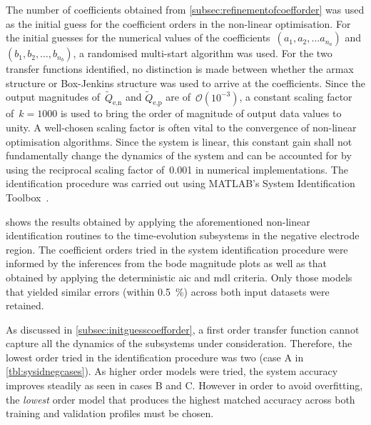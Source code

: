The  number of  coefficients obtained  from \cref{subsec:refinementofcoefforder}
was  used as  the initial  guess for  the coefficient  orders in  the non-linear
optimisation.  For  the  initial  guesses   for  the  numerical  values  of  the
coefficients~$(a_1, a_2,  \dots a_{n_a})$ and ${(b_1, b_2, \dots  , b_{n_b} )}$, a
randomised  multi-start  algorithm was  used.  For  the two  transfer  functions
identified, no distinction is made  between whether the \gls{armax} structure or
Box-Jenkins structure was  used to arrive at the coefficients.  Since the output
magnitudes of~$\widetilde{Q}_{\text{e,n}}$  and $\widetilde{Q}_{\text{e,p}}$ are
of~$\mathcal{O}(10^{-3})$,  a  constant  scaling   factor  of~${k  =  1000}$  is
used  to  bring the  order  of  magnitude of  output  data  values to  unity.  A
well-chosen  scaling factor  is often  vital  to the  convergence of  non-linear
optimisation algorithms.  Since the system  is linear, this constant  gain shall
not fundamentally change the dynamics of the  system and can be accounted for by
using the reciprocal  scaling factor of~0.001 in  numerical implementations. The
identification procedure  was carried  out using MATLAB's  System Identification
Toolbox~\cite{matlabsysidtool}.



   shows   the   results  obtained   by   applying   the
aforementioned   non-linear  identification   routines  to   the  time-evolution
subsystems in the negative electrode region. The coefficient orders tried in the
system identification  procedure were informed  by the inferences from  the bode
magnitude plots as well as that obtained by applying the deterministic \gls{aic}
and \gls{mdl}  criteria. Only those  models that yielded similar  errors (within
\SI{0.5}{\percent}) across both input datasets were retained.

As  discussed  in \cref{subsec:initguesscoefforder},   a  first  order  transfer
function cannot capture all the  dynamics of the subsystems under consideration.
Therefore, the lowest order tried in  the identification procedure was two (case
A in \cref{tbl:sysidnegcases}).  As higher order  models were tried,  the system
accuracy improves steadily as  seen in cases B and C. However  in order to avoid
overfitting, the  \emph{lowest} order  model that  produces the  highest matched
accuracy across both training and validation profiles must be chosen.

